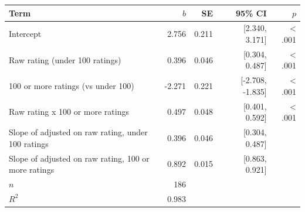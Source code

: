 \begin{tabular}{lrrrr}
\toprule
Term & $b$ & SE & 95\% CI & $p$ \\
\midrule
Intercept & 2.756 & 0.211 & [2.340, 3.171] & \textless{} .001 \\
Raw rating (under 100 ratings) & 0.396 & 0.046 & [0.304, 0.487] & \textless{} .001 \\
100 or more ratings (vs under 100) & -2.271 & 0.221 & [-2.708, -1.835] & \textless{} .001 \\
Raw rating x 100 or more ratings & 0.497 & 0.048 & [0.401, 0.592] & \textless{} .001 \\
Slope of adjusted on raw rating, under 100 ratings & 0.396 & 0.046 & [0.304, 0.487] &  \\
Slope of adjusted on raw rating, 100 or more ratings & 0.892 & 0.015 & [0.863, 0.921] &  \\
$n$ & 186 &  &  &  \\
$R^2$ & 0.983 &  &  &  \\
\bottomrule
\end{tabular}
